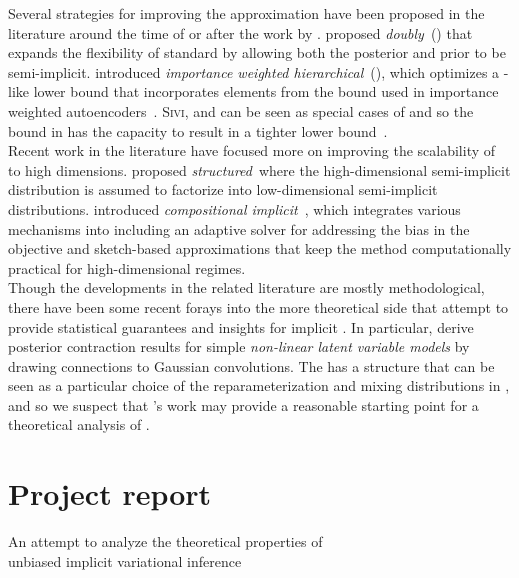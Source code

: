 \documentclass[10pt]{article}
\begin{document}
Several strategies for improving the \sivi approximation have been proposed in the literature around the time of or after the work by \citet{Titsias:2019}. \citet{Molchanov:2019} proposed \textit{doubly}~\sivi (\dsivi) that expands the flexibility of standard \sivi by allowing both the posterior and prior to be semi-implicit. \citet{Sobolev:2019} introduced \textit{importance weighted hierarchical}~\vi (\iwhvi), which optimizes a \sivi-like lower bound that incorporates elements from the bound used in importance weighted autoencoders~\citep{Burda:2015}. \textsc{Sivi}, \dsivi and \hvm can be seen as special cases of \iwhvi and so the bound in \iwhvi has the capacity to result in a tighter lower bound~\citep{Sobolev:2019}.
\\

Recent work in the literature have focused more on improving the scalability of \sivi to high dimensions. \citet{Molchanova:2019} proposed \textit{structured}~\sivi where the high-dimensional semi-implicit distribution is assumed to factorize into low-dimensional semi-implicit distributions. \citet{Moens:2021} introduced \textit{compositional implicit}~\vi, which integrates various mechanisms into \sivi including an adaptive solver for addressing the bias in the \sivi objective and sketch-based approximations that keep the method computationally practical for high-dimensional regimes.
\\

Though the developments in the related literature are mostly methodological, there have been some recent forays into the more theoretical side that attempt to provide statistical guarantees and insights for implicit \vi. In particular, \citet{Plummer:2021} derive posterior contraction results for simple \textit{non-linear latent variable models} by drawing connections to Gaussian convolutions. The \nllvm has a structure that can be seen as a particular choice of the reparameterization and mixing distributions in \uivi, and so we suspect that \citeauthor{Plummer:2021}'s work may provide a reasonable starting point for a theoretical analysis of \uivi.


\newpage


\section{Project report}

\begin{center}
\Large An attempt to analyze the theoretical properties of\\unbiased implicit variational inference
\end{center}
\end{document}
